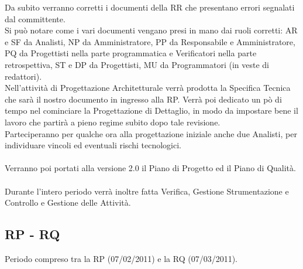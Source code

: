 Da subito verranno corretti i documenti della RR che presentano
errori segnalati dal committente. \\
Si pu\`o notare come i vari documenti vengano presi in mano dai ruoli
corretti: AR e SF da Analisti, NP da Amministratore, PP da Responsabile e
Amministratore, PQ da Progettisti nella parte programmatica e Verificatori nella
parte retrospettiva, ST e DP da Progettisti, MU da Programmatori (in veste di
redattori).\\
Nell'attivit\`a di Progettazione Architetturale verr\`a prodotta la
Specifica Tecnica che sar\`a il nostro documento in ingresso alla RP. Verr\`a poi dedicato un p\`o di tempo nel 
cominciare la Progettazione di Dettaglio, in modo da impostare bene il lavoro
che partir\`a a pieno regime subito dopo tale revisione.\\ Parteciperanno per
qualche ora alla progettazione iniziale anche due Analisti, per individuare vincoli ed eventuali rischi tecnologici.\\
\\
Verranno poi portati alla versione 2.0 il Piano di Progetto ed il Piano di
Qualit\`a.\\
\\
Durante l'intero periodo verr\`a inoltre fatta Verifica, Gestione Strumentazione
e Controllo e Gestione delle Attivit\`a.

\newpage


\subsection{RP - RQ}

\vspace{0.5cm}
Periodo compreso tra la RP (07/02/2011) e la RQ (07/03/2011).

